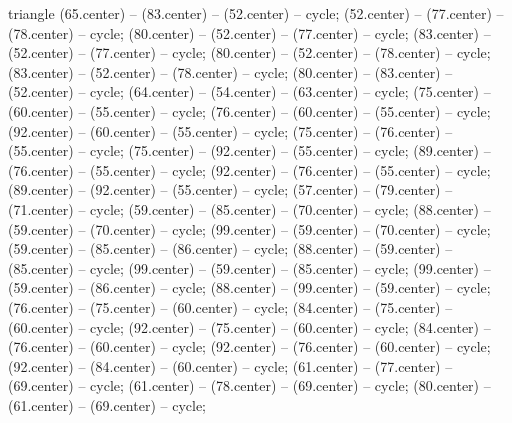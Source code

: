 {\begin{pgfonlayer}{triangle}
 (65.center) -- (83.center) -- (52.center) -- cycle; 
 (52.center) -- (77.center) -- (78.center) -- cycle; 
 (80.center) -- (52.center) -- (77.center) -- cycle; 
 (83.center) -- (52.center) -- (77.center) -- cycle; 
 (80.center) -- (52.center) -- (78.center) -- cycle; 
 (83.center) -- (52.center) -- (78.center) -- cycle; 
 (80.center) -- (83.center) -- (52.center) -- cycle; 
 (64.center) -- (54.center) -- (63.center) -- cycle; 
 (75.center) -- (60.center) -- (55.center) -- cycle; 
 (76.center) -- (60.center) -- (55.center) -- cycle; 
 (92.center) -- (60.center) -- (55.center) -- cycle; 
 (75.center) -- (76.center) -- (55.center) -- cycle; 
 (75.center) -- (92.center) -- (55.center) -- cycle; 
 (89.center) -- (76.center) -- (55.center) -- cycle; 
 (92.center) -- (76.center) -- (55.center) -- cycle; 
 (89.center) -- (92.center) -- (55.center) -- cycle; 
 (57.center) -- (79.center) -- (71.center) -- cycle; 
 (59.center) -- (85.center) -- (70.center) -- cycle; 
 (88.center) -- (59.center) -- (70.center) -- cycle; 
 (99.center) -- (59.center) -- (70.center) -- cycle; 
 (59.center) -- (85.center) -- (86.center) -- cycle; 
 (88.center) -- (59.center) -- (85.center) -- cycle; 
 (99.center) -- (59.center) -- (85.center) -- cycle; 
 (99.center) -- (59.center) -- (86.center) -- cycle; 
 (88.center) -- (99.center) -- (59.center) -- cycle; 
 (76.center) -- (75.center) -- (60.center) -- cycle; 
 (84.center) -- (75.center) -- (60.center) -- cycle; 
 (92.center) -- (75.center) -- (60.center) -- cycle; 
 (84.center) -- (76.center) -- (60.center) -- cycle; 
 (92.center) -- (76.center) -- (60.center) -- cycle; 
 (92.center) -- (84.center) -- (60.center) -- cycle; 
 (61.center) -- (77.center) -- (69.center) -- cycle; 
 (61.center) -- (78.center) -- (69.center) -- cycle; 
 (80.center) -- (61.center) -- (69.center) -- cycle; 

\end{pgfonlayer}}
